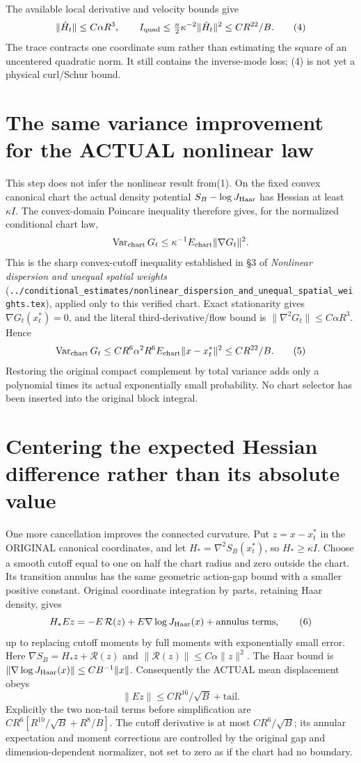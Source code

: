 \documentclass{article}
\begin{document}
The available local derivative and velocity bounds give
\[
 \|\dot H_t\|\le C\alpha R^3,\qquad
 I_{\rm quad}\le\tfrac n2\kappa^{-2}\|\dot H_t\|^2
                    \le CR^{22}/B.                  \tag{4}
\]
The trace contracts one coordinate sum rather than estimating the square of an uncentered quadratic norm. It still contains the inverse-mode loss; (4) is not yet a physical curl/Schur bound.

\section*{The same variance improvement for the ACTUAL nonlinear law}
This step does not infer the nonlinear result from(1). On the fixed convex canonical chart the actual density potential $S_B-\log J_{\rm Haar}$ has Hessian at least $\kappa I$. The convex-domain Poincare inequality therefore gives, for the normalized conditional chart law,
\[
 \operatorname{Var}_{\rm chart}G_t
 \le \kappa^{-1}E_{\rm chart}\|\nabla G_t\|^2.
\]
This is the sharp convex-cutoff inequality established in \S3 of \emph{Nonlinear dispersion and unequal spatial weights} (\texttt{../conditional\_estimates/nonlinear\_dispersion\_and\_unequal\_spatial\_weights.tex}), applied only to this verified chart. Exact stationarity gives $\nabla G_t(x_t^*)=0$, and the literal third-derivative/flow bound is
$\|\nabla^2G_t\|\le C\alpha R^3$. Hence
\[
 \operatorname{Var}_{\rm chart}G_t
 \le C R^6\alpha^2R^6 E_{\rm chart}\|x-x_t^*\|^2
 \le CR^{22}/B.                                      \tag{5}
\]
Restoring the original compact complement by total variance adds only a polynomial times its actual exponentially small probability. No chart selector has been inserted into the original block integral.

\section*{Centering the expected Hessian difference rather than its absolute value}
One more cancellation improves the connected curvature. Put $z=x-x_t^*$ in the ORIGINAL canonical coordinates, and let $H_*=\nabla^2S_B(x_t^*)$, so $H_*\ge\kappa I$.
Choose a smooth cutoff equal to one on half the chart radius and zero outside the chart. Its transition annulus has the same geometric action-gap bound with a smaller positive constant. Original coordinate integration by parts, retaining Haar density, gives
\[
 H_*E z=-E\,\mathcal R(z)+E\nabla\log J_{\rm Haar}(x)
                    +\text{annulus terms},           \tag{6}
\]
up to replacing cutoff moments by full moments with exponentially small error.
Here $\nabla S_B=H_*z+\mathcal R(z)$ and
$\|\mathcal R(z)\|\le C\alpha\|z\|^2$.
The Haar bound is
$\|\nabla\log J_{\rm Haar}(x)\|\le C B^{-1}\|x\|$.
Consequently the ACTUAL mean displacement obeys
\[
 \|Ez\|\le C R^{16}/\sqrt B+\text{tail}.               \tag{7}
\]
Explicitly the two non-tail terms before simplification are
$C R^6[R^{10}/\sqrt B+R^8/B]$.
The cutoff derivative is at most $CR^6/\sqrt B$; its annular expectation and moment corrections are controlled by the original gap and dimension-dependent normalizer, not set to zero as if the chart had no boundary.
\end{document}
